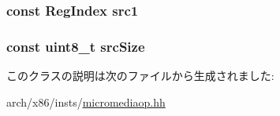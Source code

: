 \label{classX86ISA_1_1MediaOpBase_a917f1040693de798bca0ef27c390f374}
\hypertarget{classX86ISA_1_1MediaOpBase_ac0ec0327e65bf2376ccab1d826a7094e}{
\subsubsection[{src1}]{\setlength{\rightskip}{0pt plus 5cm}const {\bf RegIndex} {\bf src1}}}
\label{classX86ISA_1_1MediaOpBase_ac0ec0327e65bf2376ccab1d826a7094e}
\hypertarget{classX86ISA_1_1MediaOpBase_ae7efdf20ab0a6d4aac72876a408f86bb}{
\subsubsection[{srcSize}]{\setlength{\rightskip}{0pt plus 5cm}const uint8\_\-t {\bf srcSize}}}
\label{classX86ISA_1_1MediaOpBase_ae7efdf20ab0a6d4aac72876a408f86bb}


このクラスの説明は次のファイルから生成されました:\begin{DoxyCompactItemize}
\item 
arch/x86/insts/\hyperlink{micromediaop_8hh}{micromediaop.hh}\end{DoxyCompactItemize}
